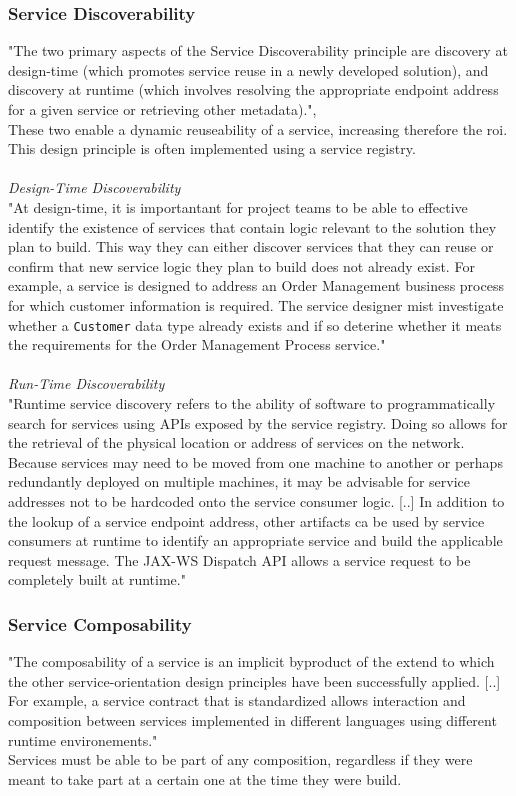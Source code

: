 \documentclass[12pt]{article}
\begin{document}
\subsubsection{Service Discoverability}
\label{sec:disc}
"The two primary aspects of the Service Discoverability principle are discovery at design-time (which promotes service reuse in a newly developed solution), and discovery at runtime (which involves resolving the appropriate endpoint address for a given service or retrieving other metadata).", \cite[page 204]{grau}\\These two enable a dynamic reuseability of a service, increasing therefore the \gls{roi}. This design principle is often implemented using a service registry. \cite[page 89]{te} \\\\
\textit{Design-Time Discoverability}\\
"At design-time, it is importantant for project teams to be able to effective identify the existence of services that contain logic relevant to the solution they plan to build. This way they can either discover services that they can reuse or confirm that new service logic they plan to build does not already exist. For example, a service is designed to address an Order Management business process for which customer information is required. The service designer mist investigate whether a \texttt{Customer} data type already exists and if so deterine whether it meats the requirements for the Order Management Process service." \cite[page 204-205]{grau}\\\\
\textit{Run-Time Discoverability}\\
"Runtime service discovery refers to the ability of software to programmatically search for services using APIs exposed by the service registry. Doing so allows for the retrieval of the physical location or address of services on the network. Because services may need to be moved from one machine to another or perhaps redundantly deployed on multiple machines, it may be advisable for service addresses not to be hardcoded onto the service consumer logic. [..] In addition to the lookup of a service endpoint address, other artifacts ca be used by service consumers at runtime to identify an appropriate service and build the applicable request message. The JAX-WS Dispatch API allows a service request to be completely built at runtime."\cite[page 205-207]{grau}
\subsubsection{Service Composability} 
"The composability of a service is an implicit byproduct of the extend to which the other service-orientation design principles have been successfully applied. [..] For example, a service contract that is standardized allows interaction and composition between services implemented in different languages using different runtime environements."\cite[page 189]{grau}\\
Services must be able to be part of any composition, regardless if they were meant to take part at a certain one at the time they were build. \cite[page 89]{te}
\end{document}
